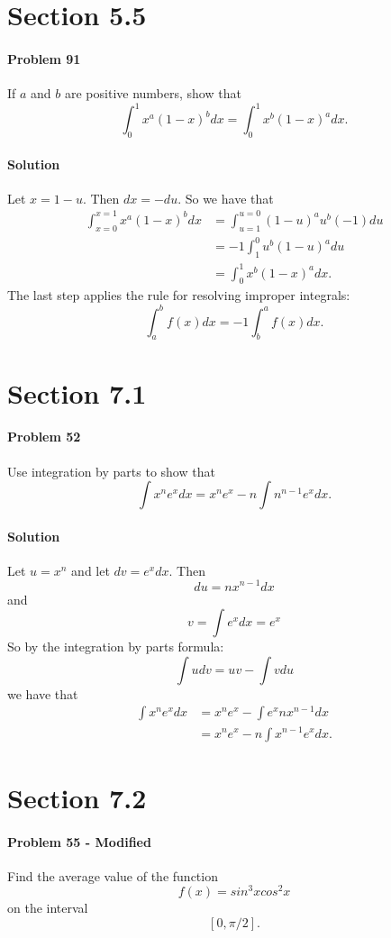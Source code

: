 \documentclass[letterpaper,12pt,oneside,onecolumn]{article}
\begin{document}
\section*{Section 5.5}
\paragraph{Problem 91}
If $a$ and $b$ are positive numbers, show that $$\int_0^1 x^a(1-x)^b dx = \int_0^1 x^b(1-x)^a dx.$$
\paragraph{Solution}
Let $x = 1-u$. Then $dx = -du$. So we have that
\begin{align*}
\int_{x=0}^{x=1} x^a(1-x)^b dx &= \int_{u=1}^{u=0} (1-u)^a u^b(-1)du \\
&= -1 \int_1^0 u^b(1-u)^a du \\
&= \int_0^1 x^b(1-x)^a dx.
\end{align*}
The last step applies the rule for resolving improper integrals:
$$\int_a^b f(x) dx = -1 \int_b^af(x) dx.$$
\section*{Section 7.1}
\paragraph{Problem 52}
Use integration by parts to show that
$$\int x^n e^x dx = x^ne^x - n\int n^{n-1} e^x dx.$$
\paragraph{Solution}
Let $u = x^n$ and let $dv = e^xdx$. Then $$du = n x^{n-1}dx$$ and $$v = \int e^x dx = e^x$$
So by the integration by parts formula:
$$ \int u dv = uv - \int v du$$
we have that
\begin{align*} \int x^n e^x dx &= x^ne^x - \int e^x n x^{n-1}dx\\ &= x^ne^x - n\int x^{n-1} e^x dx.\end{align*}
\section*{Section 7.2}
\paragraph{Problem 55 - Modified}
Find the average value of the function $$f(x) = sin^3xcos^2x$$ on the interval $$[0,\pi/2].$$
\end{document}
